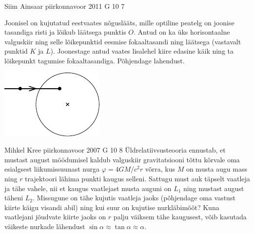 \documentclass[11pt, twoside]{article}
\begin{document}
{%
{Siim Ainsaar} %
{piirkonnavoor} %
{2011} %
{G 10} %
{7} %
{
\ifStatement
Joonisel on kujutatud eestvaates nõguslääts, mille optiline peatelg on joonise tasandiga risti ja lõikub läätsega punktis $O$. Antud on ka üks horisontaalne valguskiir ning selle lõikepunktid eesmise fokaaltasandi ning läätsega (vastavalt punktid $K$ ja $L$). Joonestage antud vaates lisalehel kiire edasine käik ning ta lõikepunkt tagumise fokaaltasandiga. Põhjendage lahendust.
\begin{center}
	\includegraphics[width=0.5\linewidth]{2011-v2g-10-yl}
\end{center}
\fi
}

{Mihkel Kree} %
{piirkonnavoor} %
{2007} %
{G 10} %
{8} %
{
\ifStatement
Üldrelatiivsusteooria ennustab, et mustast august möödumisel kaldub valguskiir gravitatsiooni tõttu kõrvale oma esialgsest liikumissuunast nurga $\varphi = 4GM/c^2r$ võrra, kus $M$ on musta augu mass ning $r$ trajektoori lähima punkti kaugus selleni. Sattugu must auk täpselt vaatleja ja tähe vahele, nii et kaugus vaatlejast musta auguni on $L_1$ ning mustast august täheni $L_2$. Missugune on tähe kujutis vaatleja jaoks (põhjendage oma vastust kiirte käigu visandi abil) ning kui suur on kujutise nurkläbimõõt? Kuna vaatlejani jõudvate kiirte jaoks on $r$ palju väiksem tähe kaugusest, võib kasutada väikeste nurkade lähendust $\sin \alpha \approx \tan \alpha \approx \alpha$.
\fi
}

}
\end{document}
